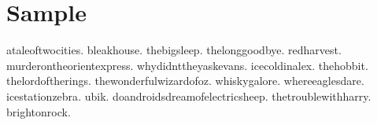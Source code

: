 \documentclass[12pt]{article}
\begin{document}
\section{Sample}

\gls{ataleoftwocities}. \gls{bleakhouse}. \gls{thebigsleep}.
\gls{thelonggoodbye}. \gls{redharvest}.
\gls{murderontheorientexpress}. \gls{whydidnttheyaskevans}.
\gls{icecoldinalex}. \gls{thehobbit}. \gls{thelordoftherings}.
\gls{thewonderfulwizardofoz}. \gls{whiskygalore}.
\gls{whereeaglesdare}. \gls{icestationzebra}. \gls{ubik}.
\gls{doandroidsdreamofelectricsheep}. \gls{thetroublewithharry}.
\gls{brightonrock}.

\printunsrtglossary[title={Author and Book List}]
\end{document}

